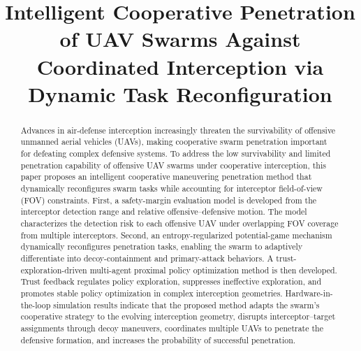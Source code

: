 \documentclass{cja}
\begin{document}
\title{Intelligent Cooperative Penetration of UAV Swarms Against Coordinated Interception via Dynamic Task Reconfiguration}


\frontheader{}

\begin{abstract}
Advances in air-defense interception increasingly threaten the survivability of offensive unmanned aerial vehicles (UAVs), making cooperative swarm penetration important for defeating complex defensive systems.
To address the low survivability and limited penetration capability of offensive UAV swarms under cooperative interception, this paper proposes an intelligent cooperative maneuvering penetration method that dynamically reconfigures swarm tasks while accounting for interceptor field-of-view (FOV) constraints.
First, a safety-margin evaluation model is developed from the interceptor detection range and relative offensive--defensive motion. The model characterizes the detection risk to each offensive UAV under overlapping FOV coverage from multiple interceptors.
Second, an entropy-regularized potential-game mechanism dynamically reconfigures penetration tasks, enabling the swarm to adaptively differentiate into decoy-containment and primary-attack behaviors.
A trust-exploration-driven multi-agent proximal policy optimization method is then developed. Trust feedback regulates policy exploration, suppresses ineffective exploration, and promotes stable policy optimization in complex interception geometries.
Hardware-in-the-loop simulation results indicate that the proposed method adapts the swarm's cooperative strategy to the evolving interception geometry, disrupts interceptor--target assignments through decoy maneuvers, coordinates multiple UAVs to penetrate the defensive formation, and increases the probability of successful penetration.
\end{abstract}
\end{document}

